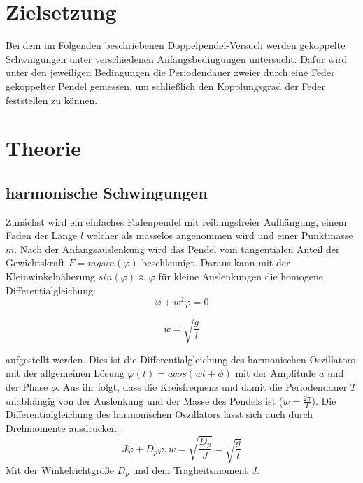 
\section{Zielsetzung}
\label{sec:Theorie}
Bei dem im Folgenden beschriebenen Doppelpendel-Versuch werden gekoppelte Schwingungen unter verschiedenen Anfangsbedingungen untersucht. Dafür wird unter den jeweiligen Bedingungen die Periodendauer zweier durch eine Feder gekoppelter Pendel gemessen, um schließlich den Kopplungsgrad der Feder feststellen zu können.
\section{Theorie}
\subsection{harmonische Schwingungen}
Zunächst wird ein einfaches Fadenpendel mit reibungsfreier Aufhängung, einem Faden der Länge $l$ 
welcher als masselos angenommen wird und einer Punktmasse $m$. Nach der Anfangsauslenkung wird das 
Pendel vom tangentialen Anteil der Gewichtskraft $F=mgsin(\varphi)$ beschleunigt.
Daraus kann mit der Kleinwinkelnäherung $sin(\varphi)\approx\varphi$ für kleine Auslenkungen die 
homogene Differentialgleichung:
\begin{equation}
\ddot{\varphi}+w^2\varphi=0
\end{equation}

\begin{equation}
w=\sqrt{\frac{g}{l}}
\end{equation}

aufgestellt werden.\newline
Dies ist die Differentialgleichung des harmonischen Oszillators mit der allgemeinen Lösung 
$\varphi(t)=acos(wt+\phi)$ mit der Amplitude $a$ und der Phase $\phi$. Aus ihr folgt, dass 
die  Kreisfrequenz und damit die Periodendauer $T$ unabhängig von der Auslenkung und der Masse 
des Pendels ist ($w=\frac{2\pi}{T}$). Die Differentialgleichung des harmonischen Oszillators lässt 
sich auch durch Drehmomente ausdrücken: 
\begin{equation}
J\ddot{\varphi}+D_p\varphi, w=\sqrt{\frac{D_p}{J}}=\sqrt{\frac{g}{l}}
\end{equation}
Mit der Winkelrichtgröße $D_p$ und dem Trägheitsmoment $J$.
